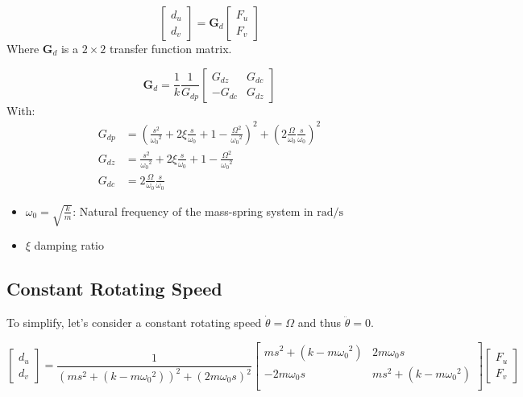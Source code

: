 \documentclass{ISMA_USD2020}
\begin{document}
\begin{equation}
\begin{bmatrix} d_u \\ d_v \end{bmatrix} =
\bm{G}_d
\begin{bmatrix} F_u \\ F_v \end{bmatrix}
\end{equation}
Where \(\bm{G}_d\) is a \(2 \times 2\) transfer function matrix.

\begin{equation}
\bm{G}_d = \frac{1}{k} \frac{1}{G_{dp}}
\begin{bmatrix}
   G_{dz} & G_{dc} \\
  -G_{dc} & G_{dz}
\end{bmatrix}
\end{equation}
With:
\begin{subequations}
  \begin{align}
    G_{dp} &= \left( \frac{s^2}{{\omega_0}^2} + 2 \xi \frac{s}{\omega_0} + 1 - \frac{{\Omega}^2}{{\omega_0}^2} \right)^2 + \left( 2 \frac{\Omega}{\omega_0} \frac{s}{\omega_0} \right)^2 \\
    G_{dz} &= \frac{s^2}{{\omega_0}^2} + 2 \xi \frac{s}{\omega_0} + 1 - \frac{{\Omega}^2}{{\omega_0}^2} \\
    G_{dc} &= 2 \frac{\Omega}{\omega_0} \frac{s}{\omega_0}
  \end{align}
\end{subequations}

\begin{itemize}
\item \(\omega_0 = \sqrt{\frac{k}{m}}\): Natural frequency of the mass-spring system in \(\si{\radian/\s}\)
\item \(\xi\) damping ratio
\end{itemize}


\subsection{Constant Rotating Speed}
\label{sec:orga4faf60}
To simplify, let's consider a constant rotating speed \(\dot{\theta} = \Omega\) and thus \(\ddot{\theta} = 0\).

\begin{equation}
\label{eq:coupledplant}
\begin{bmatrix} d_u \\ d_v \end{bmatrix} =
\frac{1}{(m s^2 + (k - m{\omega_0}^2))^2 + (2 m {\omega_0} s)^2}
\begin{bmatrix}
  ms^2 + (k-m{\omega_0}^2) & 2 m \omega_0 s \\
  -2 m \omega_0 s          & ms^2 + (k-m{\omega_0}^2) \\
\end{bmatrix}
\begin{bmatrix} F_u \\ F_v \end{bmatrix}
\end{equation}
\end{document}
